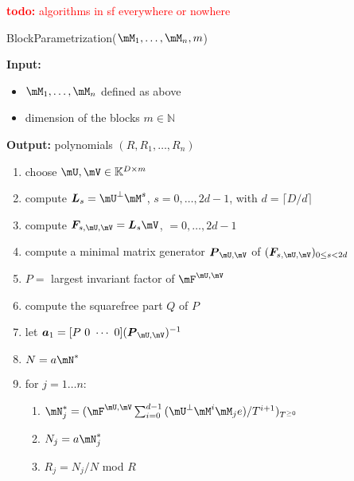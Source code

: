 \documentclass[12pt]{article}
\newcommand{\mat}[1]{\bm{\MakeUppercase{#1}}} %
\newcommand{\row}[1]{\bm{\MakeLowercase{#1}}} %
\newcommand{\seqelt}[1]{\bm{F}_{#1}} %
\newcommand{\todo}[1]{\textcolor{red}{{\bf todo:} #1}}
\newcommand{\minpoly}{P}
\newcommand{\mainalgoname}{{\sf BlockParametrization}}
\begin{document}
\todo{algorithms in sf everywhere or nowhere}


\begin{algorithm}[H]
	\caption{\mainalgoname($\mM_1,\dots,\mM_n,m$)}
	{\bf Input:} \vspace{-0.5em}
	\begin{itemize}
		\item $\mM_1,\dots,\mM_n$ defined as above
		\item dimension of the blocks $m \in \mathbb{N}$
	\end{itemize}
	{\bf Output:} polynomials $(R,R_1,\dots,R_n)$
  \begin{enumerate}[{\bf 1.}]
		\item {\sf choose $\mU,\mV \in \mathbb{K}^{D \times m}$}
                \item {\sf compute $\mat{L}_s = \mU^{\perp}\mM^s$, $s=0,\dots,2d-1$, with $d = \lceil D/d \rceil$}
		\item {\sf compute $\seqelt{s,\mU,\mV}= \mat{L}_s\mV$, $=0,\dots, 2d-1$}
		\item {\sf compute a minimal matrix generator $\mat{P}_{\mU,\mV}$ of $(\seqelt{s,\mU,\mV})_{0 \le s < 2d}$}
		\item {\sf $\minpoly=$ largest invariant factor of $\mF^{\mU,\mV}$}
		\item {\sf compute the squarefree part $Q$ of $\minpoly$}
		\item {\sf let $\row{a}_1 = [P~0 ~\cdots~ 0] (\mat{P}_{\mU,\mV})^{-1}$}
		\item {\sf $N=a\mN^*$}
		\item {\sf for $j = 1 \dots n$:}
    \begin{enumerate}[{\bf 9.1.}]
			\item {\sf	$\mN_j^* = (\mF^{\mU,\mV}
				\sum_{i= 0}^{d-1} {(\mU^{\perp}\mM^i \mM_j e)}/{T^{i+1}})_{T^{\ge0}}$}
			\item {\sf $N_j=a\mN_j^*$}
			\item {\sf $R_j=N_j/N$ mod $R$}
		\end{enumerate}
	\end{enumerate}
	\label{algo:block-sparse-fglm}
\end{algorithm}
\end{document}
